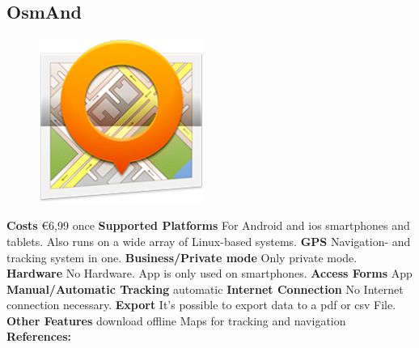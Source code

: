\begin{singlespace}
\section{OsmAnd} 
\begin{figure}
\centering
\includegraphics[width=0.48\textwidth]{bilder/osmand.png}
\end{figure}



\textbf{Costs} \euro 6,99 once\newline\newline
\textbf{Supported Platforms} For Android and \gls{ios} smartphones and tablets. Also runs on a wide array of Linux-based systems.\newline\newline
\textbf{GPS} Navigation- and tracking  system in one.\newline\newline
\textbf{Business/Private mode} Only private mode.\newline\newline
\textbf{Hardware} No Hardware. App is only used on smartphones.\newline\newline
\textbf{Access Forms} App\newline\newline
\textbf{Manual/Automatic Tracking} automatic\newline\newline
\textbf{Internet Connection} No Internet connection necessary.\newline\newline
\textbf{Export} It’s possible to export data to a \gls{pdf} or \gls{csv} File.\newline\newline
\textbf{Other Features} download offline Maps for tracking and navigation\newline\newline
\textbf{References:} \cite{osmand}
\newpage


\end{singlespace}
